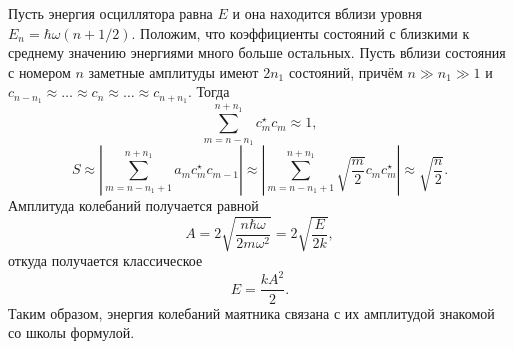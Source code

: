 Пусть энергия осциллятора равна \( E \) и она находится вблизи уровня \( E_n = \hbar\omega(n+1/2) \). Положим, что коэффициенты состояний с близкими к среднему значению энергиями много больше остальных. Пусть вблизи состояния с номером \( n \) заметные амплитуды имеют \( 2n_1 \) состояний, причём \( n \gg n_1 \gg 1 \) и \( c_{n-n_1} \approx \ldots \approx c_n \approx \ldots \approx c_{n+n_1} \). Тогда
\[
    \sum_{m=n-n_1}^{n+n_1} c_m^\star  c_{m} \approx 1,
\]
\[
    S \approx \left|\sum_{m=n-n_1+1}^{n+n_1} a_m c_m^\star  c_{m-1}\right| \approx \left|\sum_{m=n-n_1+1}^{n+n_1} \sqrt{\frac{m}{2}}c_m c_m^\star \right| \approx \sqrt{\frac{n}{2}}.
\]
Амплитуда колебаний получается равной
\[
    A = 2\sqrt{\frac{n\hbar\omega}{2m\omega^2}} = 2\sqrt{\frac{E}{2k}},
\]
откуда получается классическое
\[
    E = \frac{kA^2}{2}.
\]
Таким образом, энергия колебаний маятника связана с их амплитудой знакомой со школы формулой.

